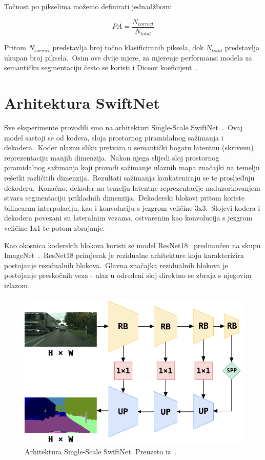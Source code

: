 \documentclass[times, utf8, seminar, numeric]{fer}
\begin{document}
Točnost po pikselima možemo definirati jednadžbom:

\begin{equation}
    PA = \frac{N_{correct}}{N_{total}}
    \label{eq:pa}
\end{equation}

Pritom $N_{correct}$ predstavlja broj točno klasificiranih piksela, dok $N_{total}$ predstavlja ukupan broj piksela.\ 
Osim ove dvije mjere, za mjerenje performansi modela za semantičku segmentaciju često se koristi i Diceov koeficijent~\cite{dice1945measures}.

\section{Arhitektura SwiftNet}

Sve eksperimente provodili smo na arhitekturi Single-Scale SwiftNet~\cite{orvsic2021efficient}.\ Ovaj model sastoji se od kodera, sloja prostornog piramidalnog sažimanja i dekodera.\ 
Koder ulaznu sliku pretvara u semantički bogatu latentnu (skrivenu) reprezentaciju manjih dimenzija.\ 
Nakon njega slijedi sloj prostornog piramidalnog sažimanja koji provodi sažimanje ulaznih mapa značajki na temelju rešetki različitih dimenzija.\ Rezultati sažimanja konkateniraju se te prosljeđuju dekoderu.\
Konačno, dekoder na temelju latentne reprezentacije naduzorkovanjem stvara segmentaciju prikladnih dimenzija.\
Dekoderski blokovi pritom koriste bilinearnu interpolaciju, kao i konvoluciju s jezgrom veličine 3x3.\
Slojevi kodera i dekodera povezani su lateralnim vezama, ostvarenim kao konvolucija s jezgrom veličine 1x1 te potom zbrajanje.\
  
Kao okosnica koderskih blokova koristi se model ResNet18~\cite{he2016deep} prednaučen na skupu ImageNet~\cite{deng2009imagenet}.\ 
ResNet18 primjerak je rezidualne arhitekture koju karakterizira postojanje rezidualnih blokova.\ 
Glavna značajka rezidualnih blokova je postojanje preskočnih veza - ulaz u određeni sloj direktno se zbraja s njegovim izlazom.\

\begin{figure}[htb]
    \centering
    \includegraphics[scale=0.425]{./Slike/swiftnet.png}
    \caption{Arhitektura Single-Scale SwiftNet. Preuzeto iz~\cite{orvsic2021efficient}.}
    \label{fig:swiftnet}
\end{figure}
\end{document}
